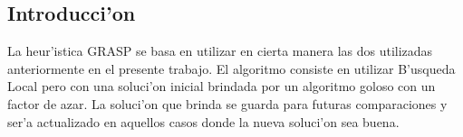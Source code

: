 \subsection{Introducci'on}
La heur'istica GRASP se basa en utilizar en cierta manera las dos utilizadas anteriormente en el presente trabajo. El algoritmo consiste en utilizar B'usqueda Local pero con una soluci'on inicial brindada por un algoritmo goloso con un factor de azar. La soluci'on que brinda se guarda para futuras comparaciones y ser'a actualizado en aquellos casos donde la nueva soluci'on sea buena.
